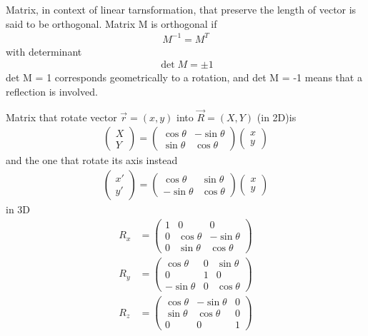 \documentclass[../main.tex]{subfiles}
\begin{document}
Matrix, in context of linear tarnsformation, that preserve the length of vector is said to be orthogonal.
Matrix M is orthogonal if
\begin{align*}
    M^{-1}=M^T
\end{align*} 
with determinant
\begin{align*}
    \det M = \pm 1
\end{align*}
det M = 1 corresponds geometrically to a rotation, and det M = -1 means that a reflection is involved.

Matrix that rotate vector $\vec{r}=(x,y)$ into $\vec{R}=(X,Y)$ (in 2D)is
\begin{align*}
    \begin{pmatrix}
        X\\Y
    \end{pmatrix}=
    \begin{pmatrix}
        \cos \theta&-\sin \theta\\
        \sin \theta& \cos \theta
    \end{pmatrix}
    \begin{pmatrix}
        x\\y
    \end{pmatrix}
\end{align*}
and the one that rotate its axis instead
\begin{align*}
    \begin{pmatrix}
        x'\\y'
    \end{pmatrix}=
    \begin{pmatrix}
        \cos \theta&\sin \theta\\
        -\sin \theta& \cos \theta
    \end{pmatrix}
    \begin{pmatrix}
        x\\y
    \end{pmatrix}
\end{align*}
in 3D 
\begin{align*}
    R_x&=\begin{pmatrix}
        1&0&0\\
        0&\cos\theta&-\sin\theta\\
        0&\sin\theta&\cos\theta
    \end{pmatrix}\\
    R_y&=\begin{pmatrix}
        \cos\theta&0&\sin\theta\\
        0&1&0\\
        -\sin\theta&0&\cos\theta
    \end{pmatrix}\\
    R_z&=\begin{pmatrix}
        \cos \theta&-\sin \theta&0\\
        \sin \theta& \cos \theta&0\\
        0&0&1
    \end{pmatrix}
\end{align*}
\end{document}
